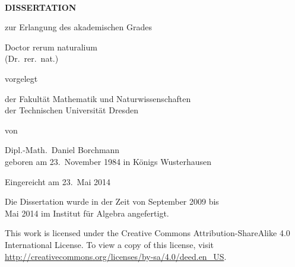 
~\cleardoublepage

\begin{center}
  \vfill{}

  \Huge\makeatletter{\textbf{\@title}}\makeatother

  \vfill{}

  \LARGE
  \textbf{D\;I\;S\;S\;E\;R\;T\;A\;T\;I\;O\;N}

  \vspace*{2ex}
  zur Erlangung des akademischen Grades
  \vspace*{2ex}

  Doctor rerum naturalium \\
  (Dr.\ rer.\ nat.)

  \vfill

  vorgelegt

  \vfill

  der Fakultät Mathematik und Naturwissenschaften\\
  der Technischen Universität Dresden

  \vfill

  von

  \vfill

  {\large
    Dipl.-Math.\ Daniel Borchmann\\
    \vspace*{.7ex}
    geboren am 23.\ November 1984 in Königs Wusterhausen
  }

  \vfill

  Eingereicht am 23.\ Mai 2014

  \vfill

  \large

  Die Dissertation wurde in der Zeit von September 2009 bis\\
  Mai 2014 im Institut für Algebra angefertigt.
\end{center}

\newpage

\vspace*{\fill}

\noindent%
This work is licensed under the Creative Commons Attribution-ShareAlike 4.0 International
License. To view a copy of this license, visit
\url{http://creativecommons.org/licenses/by-sa/4.0/deed.en_US}.

